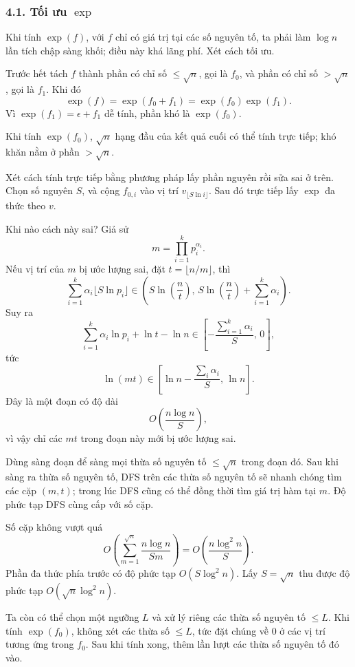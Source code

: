 \documentclass[11pt]{article}
\begin{document}
\subsubsection*{4.1. Tối ưu \(\exp\)}

Khi tính \(\exp(f)\), với \(f\) chỉ có giá trị tại các số nguyên tố, ta phải
làm \(\log n\) lần tích chập sàng khối; điều này khá lãng phí. Xét cách tối
ưu.

Trước hết tách \(f\) thành phần có chỉ số \(\le\sqrt n\), gọi là \(f_0\), và
phần có chỉ số \(>\sqrt n\), gọi là \(f_1\). Khi đó
\[
  \exp(f)=\exp(f_0+f_1)=\exp(f_0)\exp(f_1).
\]
Vì \(\exp(f_1)=\epsilon+f_1\) dễ tính, phần khó là \(\exp(f_0)\).

Khi tính \(\exp(f_0)\), \( \sqrt n \) hạng đầu của kết quả cuối có thể tính
trực tiếp; khó khăn nằm ở phần \(>\sqrt n\).

Xét cách tính trực tiếp bằng phương pháp lấy phần nguyên rồi sửa sai ở trên.
Chọn số nguyên \(S\), và cộng \(f_{0,i}\) vào vị trí
\(v_{\lfloor S\ln i\rfloor}\). Sau đó trực tiếp lấy \(\exp\) đa thức theo
\(v\).

Khi nào cách này sai? Giả sử
\[
  m=\prod_{i=1}^{k}p_i^{\alpha_i}.
\]
Nếu vị trí của \(m\) bị ước lượng sai, đặt \(t=\lfloor n/m\rfloor\), thì
\[
  \sum_{i=1}^{k}\alpha_i\lfloor S\ln p_i\rfloor
  \in
  \left(S\ln\left(\frac{n}{t}\right),\,
        S\ln\left(\frac{n}{t}\right)+\sum_{i=1}^{k}\alpha_i\right).
\]
Suy ra
\[
  \sum_{i=1}^{k}\alpha_i\ln p_i+\ln t-\ln n
  \in
  \left[-\frac{\sum_{i=1}^{k}\alpha_i}{S},\,0\right],
\]
tức
\[
  \ln(mt)\in
  \left[\ln n-\frac{\sum_i\alpha_i}{S},\,\ln n\right].
\]
Đây là một đoạn có độ dài
\[
  O\left(\frac{n\log n}{S}\right),
\]
vì vậy chỉ các \(mt\) trong đoạn này mới bị ước lượng sai.

Dùng sàng đoạn để sàng mọi thừa số nguyên tố \(\le\sqrt n\) trong đoạn đó. Sau
khi sàng ra thừa số nguyên tố, DFS trên các thừa số nguyên tố sẽ nhanh chóng
tìm các cặp \((m,t)\); trong lúc DFS cũng có thể đồng thời tìm giá trị hàm tại
\(m\). Độ phức tạp DFS cùng cấp với số cặp.

Số cặp không vượt quá
\[
  O\left(\sum_{m=1}^{\sqrt n}\frac{n\log n}{Sm}\right)
  =
  O\left(\frac{n\log^2 n}{S}\right).
\]
Phần đa thức phía trước có độ phức tạp \(O(S\log^2 n)\). Lấy \(S=\sqrt n\) thu
được độ phức tạp \(O(\sqrt n\log^2 n)\).

Ta còn có thể chọn một ngưỡng \(L\) và xử lý riêng các thừa số nguyên tố
\(\le L\). Khi tính \(\exp(f_0)\), không xét các thừa số \(\le L\), tức đặt
chúng về \(0\) ở các vị trí tương ứng trong \(f_0\). Sau khi tính xong, thêm
lần lượt các thừa số nguyên tố đó vào.
\end{document}
